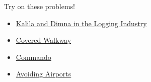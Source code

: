 \documentclass{beamer}
\begin{document}
\begin{frame}{Try on these problems!}
    \begin{itemize}
        \item \href{https://codeforces.com/contest/319/problem/C}{Kalila and Dimna in the Logging Industry}
        \item \href{https://open.kattis.com/problems/coveredwalkway}{Covered Walkway}
        \item \href{https://dmoj.ca/problem/apio10p1}{Commando}
        \item \href{https://open.kattis.com/problems/avoidingairports}{Avoiding Airports}
    \end{itemize}
\end{frame}
\end{document}
